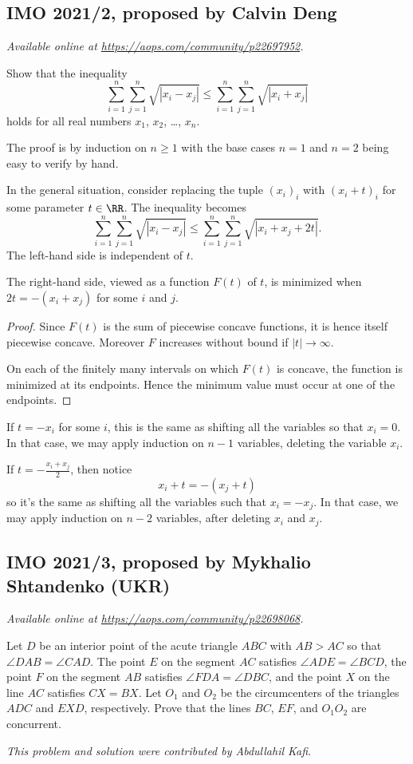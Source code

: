 \documentclass[11pt]{scrartcl}
\begin{document}
\subsection{IMO 2021/2, proposed by Calvin Deng}
\textsl{Available online at \url{https://aops.com/community/p22697952}.}
\begin{mdframed}[style=mdpurplebox,frametitle={Problem statement}]
Show that the inequality
\[\sum_{i=1}^n \sum_{j=1}^n \sqrt{|x_i-x_j|}
  \le \sum_{i=1}^n \sum_{j=1}^n \sqrt{|x_i+x_j|} \]
holds for all real numbers $x_1$, $x_2$, \dots, $x_n$.
\end{mdframed}
The proof is by induction on $n \ge 1$ with the base cases $n=1$ and
$n=2$ being easy to verify by hand.

In the general situation, consider replacing the tuple $(x_i)_i$
with $(x_i+t)_i$ for some parameter $t \in \RR$.
The inequality becomes
\[\sum_{i=1}^n \sum_{j=1}^n \sqrt{|x_i-x_j|}
  \le \sum_{i=1}^n \sum_{j=1}^n \sqrt{|x_i+x_j+2t|}. \]
The left-hand side is independent of $t$.
\begin{claim*}
  The right-hand side, viewed as a function $F(t)$ of $t$,
  is minimized when $2t = -(x_i + x_j)$ for some $i$ and $j$.
\end{claim*}
\begin{proof}
  Since $F(t)$ is the sum of piecewise concave functions,
  it is hence itself piecewise concave.
  Moreover $F$ increases without bound if $|t| \to \infty$.

  On each of the finitely many intervals on which $F(t)$ is
  concave, the function is minimized at its endpoints.
  Hence the minimum value must occur at one of the endpoints.
\end{proof}

If $t = -x_i$ for some $i$, this is the same as shifting all the
variables so that $x_i = 0$.
In that case, we may apply induction on $n-1$ variables,
deleting the variable $x_i$.

If $t = -\frac{x_i+x_j}{2}$, then notice
\[ x_i + t = -(x_j + t) \]
so it's the same as shifting all the variables such that $x_i = -x_j$.
In that case, we may apply induction on $n-2$ variables,
after deleting $x_i$ and $x_j$.
\pagebreak

\subsection{IMO 2021/3, proposed by Mykhalio Shtandenko (UKR)}
\textsl{Available online at \url{https://aops.com/community/p22698068}.}
\begin{mdframed}[style=mdpurplebox,frametitle={Problem statement}]
Let $D$ be an interior point of the acute triangle $ABC$
with $AB > AC$ so that $\angle DAB = \angle CAD$.
The point $E$ on the segment $AC$ satisfies $\angle ADE =\angle BCD$,
the point $F$ on the segment $AB$ satisfies $\angle FDA =\angle DBC$,
and the point $X$ on the line $AC$ satisfies $CX = BX$.
Let $O_1$ and $O_2$ be the circumcenters of the triangles
$ADC$ and $EXD$, respectively.
Prove that the lines $BC$, $EF$, and $O_1O_2$ are concurrent.
\end{mdframed}
\emph{This problem and solution were contributed by Abdullahil Kafi}.
\end{document}
